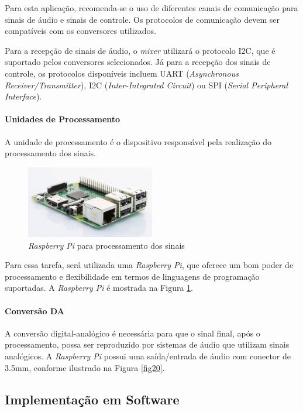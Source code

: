 Para esta aplicação, recomenda-se o uso de diferentes canais de comunicação para sinais de áudio e sinais de controle. Os protocolos de comunicação devem ser compatíveis com os conversores utilizados.

Para a recepção de sinais de áudio, o \textit{mixer} utilizará o protocolo I2C, que é suportado pelos conversores selecionados. Já para a recepção dos sinais de controle, os protocolos disponíveis incluem UART (\textit{Asynchronous Receiver/Transmitter}), I2C (\textit{Inter-Integrated Circuit}) ou SPI (\textit{Serial Peripheral Interface}).

\paragraph{Unidades de Processamento}

A unidade de processamento é o dispositivo responsável pela realização do processamento dos sinais. 

\begin{figure}[h]
    \centering
    \includegraphics[width=0.5\textwidth]{figuras/fig65.jpg}
    \caption{\textit{Raspberry Pi} para processamento dos sinais \cite{adrenalineDisplaysLanar}}
    \label{fig65}
\end{figure}

Para essa tarefa, será utilizada uma \textit{Raspberry Pi}, que oferece um bom poder de processamento e flexibilidade em termos de linguagens de programação suportadas. A \textit{Raspberry Pi} é mostrada na Figura \ref{fig65}.

\paragraph{Conversão DA}

A conversão digital-analógico é necessária para que o sinal final, após o processamento, possa ser reproduzido por sistemas de áudio que utilizam sinais analógicos. A \textit{Raspberry Pi} possui uma saída/entrada de áudio com conector de 3.5mm, conforme ilustrado na Figura \ref{fig20}.

\subsection{Implementação em Software}


